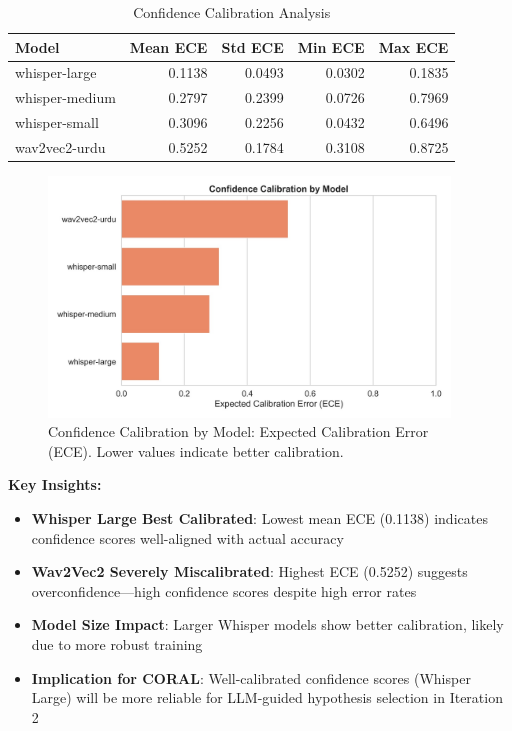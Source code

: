 \begin{table}[H]
\centering
\caption{Confidence Calibration Analysis}
\label{tab:calibration}
\begin{tabular}{lrrrr}
\toprule
\textbf{Model} & \textbf{Mean ECE} & \textbf{Std ECE} & \textbf{Min ECE} & \textbf{Max ECE} \\
\midrule
whisper-large  & 0.1138 & 0.0493 & 0.0302 & 0.1835 \\
whisper-medium & 0.2797 & 0.2399 & 0.0726 & 0.7969 \\
whisper-small  & 0.3096 & 0.2256 & 0.0432 & 0.6496 \\
wav2vec2-urdu  & 0.5252 & 0.1784 & 0.3108 & 0.8725 \\
\bottomrule
\end{tabular}
\end{table}

\begin{figure}[H]
    \centering
    \includegraphics[width=0.95\textwidth]{ThesisFigs/caliberation.jpg}
    \caption{Confidence Calibration by Model: Expected Calibration Error (ECE). Lower values indicate better calibration.}
    \label{fig:calibration}
\end{figure}

\textbf{Key Insights:}

\begin{itemize}
    \item \textbf{Whisper Large Best Calibrated}: Lowest mean ECE (0.1138) indicates confidence scores well-aligned with actual accuracy
    \item \textbf{Wav2Vec2 Severely Miscalibrated}: Highest ECE (0.5252) suggests overconfidence---high confidence scores despite high error rates
    \item \textbf{Model Size Impact}: Larger Whisper models show better calibration, likely due to more robust training
    \item \textbf{Implication for CORAL}: Well-calibrated confidence scores (Whisper Large) will be more reliable for LLM-guided hypothesis selection in Iteration 2
\end{itemize}

